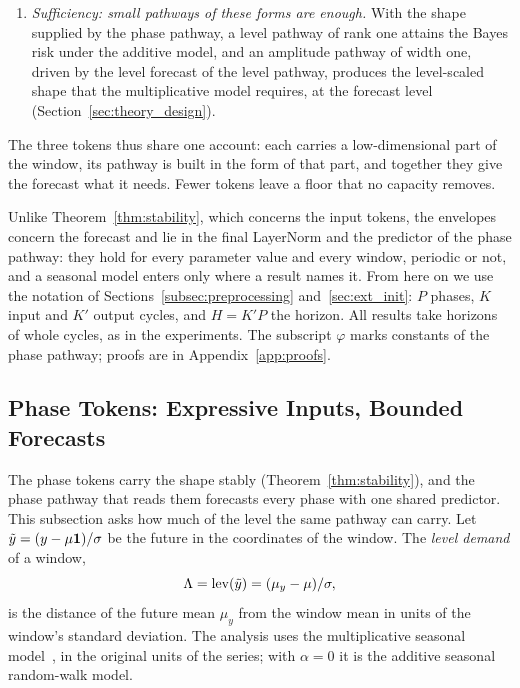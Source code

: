 {\begin{enumerate}[label=(\roman*),leftmargin=2em,itemsep=0.1em,topsep=0.2em]
\item \emph{Sufficiency: small pathways of these forms are enough.} With the shape supplied by the phase pathway, a level pathway of rank one attains the Bayes risk under the additive model, and an amplitude pathway of width one, driven by the level forecast of the level pathway, produces the level-scaled shape that the multiplicative model requires, at the forecast level (Section~\ref{sec:theory_design}).
\end{enumerate}
The three tokens thus share one account: each carries a low-dimensional part of the window, its pathway is built in the form of that part, and together they give the forecast what it needs. Fewer tokens leave a floor that no capacity removes.

Unlike Theorem~\ref{thm:stability}, which concerns the input tokens, the envelopes concern the forecast and lie in the final LayerNorm and the predictor of the phase pathway: they hold for every parameter value and every window, periodic or not, and a seasonal model enters only where a result names it. From here on we use the notation of Sections~\ref{subsec:preprocessing} and~\ref{sec:ext_init}: $P$ phases, $K$ input and $K'$ output cycles, and $H=K'P$ the horizon. All results take horizons of whole cycles, as in the experiments. The subscript $\varphi$ marks constants of the phase pathway; proofs are in Appendix~\ref{app:proofs}.

\subsection{Phase Tokens: Expressive Inputs, Bounded Forecasts}
\label{sec:theory_setup}

The phase tokens carry the shape stably (Theorem~\ref{thm:stability}), and the phase pathway that reads them forecasts every phase with one shared predictor. This subsection asks how much of the level the same pathway can carry. Let $\tilde y=(y-\mu\mathbf 1)/\sigma$ be the future in the coordinates of the window. The \emph{level demand} of a window,
\begin{equation}
\Lambda=\operatorname{lev}(\tilde y)=(\mu_y-\mu)/\sigma,
\label{eq:level_demand}
\end{equation}
is the distance of the future mean $\mu_y$ from the window mean in units of the window's standard deviation. The analysis uses the multiplicative seasonal model~, in the original units of the series; with $\alpha=0$ it is the additive seasonal random-walk model.

}
